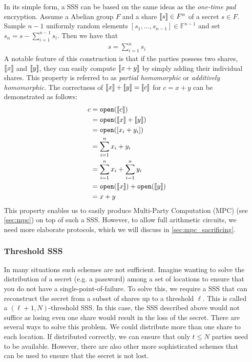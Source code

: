 \documentclass[11pt]{report}
\theoremstyle{definition}
\theoremstyle{plain}
\begin{document}
In its simple form, a SSS can be based on the same ideas as the \textit{one-time pad} encryption. Assume a Abelian group $F$ and a share $\llbracket s \rrbracket \in F^n$ of a secret $s \in F$. Sample $n-1$ uniformly random elements $[s_1, \dots, s_{n-1}] \in \mathbb{F}^{n-1}$ and set $s_n = s - \sum_{i=1}^{n-1} s_i$. Then we have that
\begin{align*}
  s = \sum_{i=1}^{n} s_i
\end{align*}
A notable feature of this construction is that if the parties possess two shares, $\llbracket x \rrbracket$ and $\llbracket y \rrbracket$, they can easily compute $\llbracket x + y \rrbracket$ by simply adding their individual shares. This property is referred to as \textit{partial homomorphic} or \textit{additively homomorphic}. The correctness of $\llbracket x \rrbracket + \llbracket y \rrbracket = \llbracket c \rrbracket$ for $c = x + y$ can be demonstrated as follows:
\begin{align*}
  c & = \texttt{open}(\llbracket c \rrbracket)                         \\
    & = \texttt{open}(\llbracket x \rrbracket + \llbracket y \rrbracket)                \\
    & = \texttt{open}([x_i + y_i])                    \\
    & = \sum_{i=1}^{n} x_i + y_i                      \\
    & = \sum_{i=1}^{n} x_i + \sum_{i=1}^{n} y_i       \\
    & = \texttt{open}(\llbracket x \rrbracket) + \texttt{open}(\llbracket y \rrbracket) \\
    & = x + y
\end{align*}
This property enables us to easily produce Multi-Party Computation (MPC) (see \autoref{sec:mpc}) on top of such a SSS\@. However, to allow full arithmetic circuits, we need more elaborate protocols, which we will discuss in \autoref{sec:mpc_sacrificing}.

\subsubsection{Threshold SSS}\label{sub:threshold-sss}

In many situations such schemes are not sufficient. Imagine wanting to solve the distribution of a secret (e.g. a password) among a set of locations to ensure that you do not have a single-point-of-failure. To solve this, we require a SSS that can reconstruct the secret from a subset of shares up to a threshold $\ell$. This is called a $(\ell + 1, N)$-threshold SSS\@.
In this case, the SSS described above would not suffice as losing even one share would result in the loss of the secret. There are several ways to solve this problem. We could distribute more than one share to each location. If distributed correctly, we can ensure that only $t \leq N$ parties need to be available. However, there are also other more sophisticated schemes that can be used to ensure that the secret is not lost.
\end{document}
